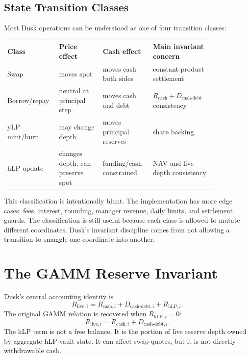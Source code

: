 \documentclass[11pt]{article}
\newcommand{\cash}{\mathrm{cash}}
\newcommand{\live}{\mathrm{live}}
\newcommand{\hlp}{\mathrm{hLP}}
\newcommand{\debt}{\mathrm{debt}}
\begin{document}
\subsection{State Transition Classes}

Most Dusk operations can be understood as one of four transition classes:
\begin{center}
\begin{tabular}{p{0.16\linewidth}p{0.19\linewidth}p{0.21\linewidth}p{0.29\linewidth}}
\toprule
Class & Price effect & Cash effect & Main invariant concern \\
\midrule
Swap & moves spot & moves cash both sides & constant-product settlement \\
Borrow/repay & neutral at principal step & moves cash and debt & $R_{\cash}+D_{\cash\text{-}\debt}$ consistency \\
yLP mint/burn & may change depth & moves principal reserves & share backing \\
hLP update & changes depth, can preserve spot & funding/cash constrained & NAV and live-depth consistency \\
\bottomrule
\end{tabular}
\end{center}

This classification is intentionally blunt. The implementation has more edge cases: fees, interest, rounding, manager revenue, daily limits, and settlement guards. The classification is still useful because each class is allowed to mutate different coordinates. Dusk's invariant discipline comes from not allowing a transition to smuggle one coordinate into another.

\section{The GAMM Reserve Invariant}

Dusk's central accounting identity is
\begin{equation}
\boxed{R_{\live,i}=R_{\cash,i}+D_{\cash\text{-}\debt,i}+R_{\hlp,i}.}
\label{eq:gamm}
\end{equation}
The original GAMM relation is recovered when $R_{\hlp,i}=0$:
\begin{equation}
R_{\live,i}=R_{\cash,i}+D_{\cash\text{-}\debt,i}.
\end{equation}
The hLP term is not a free balance. It is the portion of live reserve depth owned by aggregate hLP vault state. It can affect swap quotes, but it is not directly withdrawable cash.
\end{document}
